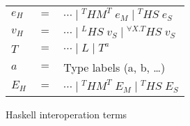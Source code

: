 \begin{figure}
\begin{center}
\begin{tabular}{lcl}
$e_{H}$ & $=$ & $\cdots\;\vert\;^{T}HM^{T}\;e_{M}\;\vert\;^{T}HS\;e_{S}$ \\
$v_{H}$ & $=$ & $\cdots\;\vert\;^{L}HS\;v_{S}\;\vert\;^{\forall X.T}HS\;v_{S}$ \\
$T$ & $=$ & $\cdots\;\vert\;L\;\vert\;T^{a}$ \\
$a$ & $=$ & Type labels (a, b, \ldots) \\
$E_{H}$ & $=$ & $\cdots\;\vert\;^{T}HM^{T}\;E_{M}\;\vert\;^{T}HS\;E_{S}$
\end{tabular}
\end{center}
\caption{Haskell interoperation terms}
\label{fig:hit}
\end{figure}